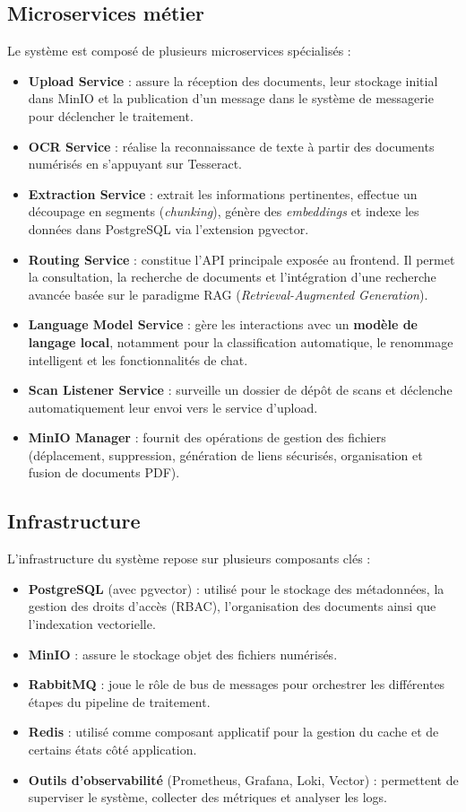 \documentclass[12pt,a4paper]{report}
\begin{document}
\subsection{Microservices métier}
Le système est composé de plusieurs microservices spécialisés :
\begin{itemize}
  \item \textbf{Upload Service} : assure la réception des documents, leur stockage initial dans MinIO et la publication d’un message dans le système de messagerie pour déclencher le traitement.
  \item \textbf{OCR Service} : réalise la reconnaissance de texte à partir des documents numérisés en s’appuyant sur Tesseract.
  \item \textbf{Extraction Service} : extrait les informations pertinentes, effectue un découpage en segments (\textit{chunking}), génère des \textit{embeddings} et indexe les données dans PostgreSQL via l’extension pgvector.
  \item \textbf{Routing Service} : constitue l’API principale exposée au frontend. Il permet la consultation, la recherche de documents et l’intégration d’une recherche avancée basée sur le paradigme RAG (\textit{Retrieval-Augmented Generation}).
  \item \textbf{Language Model Service} : gère les interactions avec un \textbf{modèle de langage local}, notamment pour la classification automatique, le renommage intelligent et les fonctionnalités de chat.
  \item \textbf{Scan Listener Service} : surveille un dossier de dépôt de scans et déclenche automatiquement leur envoi vers le service d’upload.
  \item \textbf{MinIO Manager} : fournit des opérations de gestion des fichiers (déplacement, suppression, génération de liens sécurisés, organisation et fusion de documents PDF).
\end{itemize}

\subsection{Infrastructure}
L’infrastructure du système repose sur plusieurs composants clés :
\begin{itemize}
  \item \textbf{PostgreSQL} (avec pgvector) : utilisé pour le stockage des métadonnées, la gestion des droits d’accès (RBAC), l’organisation des documents ainsi que l’indexation vectorielle.
  \item \textbf{MinIO} : assure le stockage objet des fichiers numérisés.
  \item \textbf{RabbitMQ} : joue le rôle de bus de messages pour orchestrer les différentes étapes du pipeline de traitement.
  \item \textbf{Redis} : utilisé comme composant applicatif pour la gestion du cache et de certains états côté application.
  \item \textbf{Outils d’observabilité} (Prometheus, Grafana, Loki, Vector) : permettent de superviser le système, collecter des métriques et analyser les logs.
\end{itemize}
\end{document}
